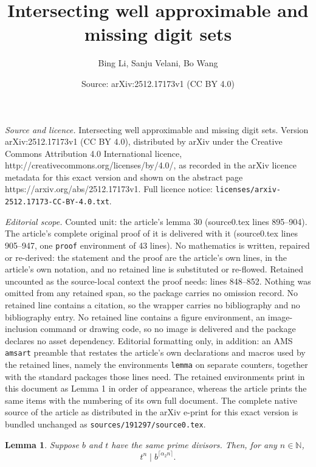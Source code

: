 \documentclass[10pt,a4paper]{amsart}
\title{Intersecting well approximable and missing digit sets}
\author{Bing Li, Sanju Velani, Bo Wang}
\date{Source: arXiv:2512.17173v1 (CC BY 4.0)}
\newtheorem{lemma}{Lemma}
\begin{document}
\maketitle

\noindent\emph{Source and licence.} Intersecting well approximable and missing digit sets. Version arXiv:2512.17173v1 (CC BY 4.0), distributed by arXiv under the Creative Commons Attribution 4.0 International licence, http://creativecommons.org/licenses/by/4.0/, as recorded in the arXiv licence metadata for this exact version and shown on the abstract page https://arxiv.org/abs/2512.17173v1. Full licence notice: \texttt{licenses/arxiv-2512.17173-CC-BY-4.0.txt}.\par\smallskip

\noindent\textit{Editorial scope.} Counted unit: the article's lemma 30 (source0.tex lines 895--904). The article's complete original proof of it is delivered with it (source0.tex lines 905--947, one \texttt{proof} environment of 43 lines). No mathematics is written, repaired or re-derived: the statement and the proof are the article's own lines, in the article's own notation, and no retained line is substituted or re-flowed.  Retained uncounted as the source-local context the proof needs: lines 848--852.  Nothing was omitted from any retained span, so the package carries no omission record.  No retained line contains a citation, so the wrapper carries no bibliography and no bibliography entry.  No retained line contains a figure environment, an image-inclusion command or drawing code, so no image is delivered and the package declares no asset dependency.  Editorial formatting only, in addition: an AMS \texttt{amsart} preamble that restates the article's own declarations and macros used by the retained lines, namely the environments \texttt{lemma} on separate counters, together with the standard packages those lines need.  The retained environments print in this document as Lemma 1 in order of appearance, whereas the article prints the same items with the numbering of its own full document.  The complete native source of the article as distributed in the arXiv e-print for this exact version is bundled unchanged as \texttt{sources/191297/source0.tex}.
\begin{lemma}\label{divisible 5}  
Suppose $b$ and $t$ have the same prime divisors.  Then,  
for any $n\in\mathbb{N}$,
$$t^{n}\mid b^{\lceil \alpha_{2}n\rceil}.$$
\end{lemma}
\end{document}
